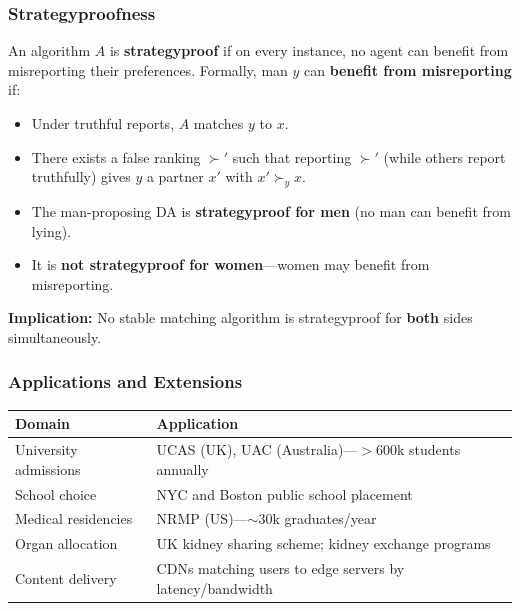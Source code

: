 \separator

\subsubsection{Strategyproofness}

\begin{defbox}[Strategyproofness]
An algorithm $A$ is \textbf{strategyproof} if on every instance, no agent can benefit from misreporting their preferences. Formally, man $y$ can \textbf{benefit from misreporting} if:
\begin{itemize}
  \item Under truthful reports, $A$ matches $y$ to $x$.
  \item There exists a false ranking $\succ'$ such that reporting $\succ'$ (while others report truthfully) gives $y$ a partner $x'$ with $x' \succ_y x$.
\end{itemize}
\end{defbox}

\begin{thmbox}[Strategyproofness of DA]
\begin{itemize}
  \item The man-proposing DA is \textbf{strategyproof for men} (no man can benefit from lying).
  \item It is \textbf{not strategyproof for women}---women may benefit from misreporting.
\end{itemize}

\textbf{Implication:} No stable matching algorithm is strategyproof for \textbf{both} sides simultaneously.
\end{thmbox}

\bigseparator

\subsubsection{Applications and Extensions}

\begin{defbox}
\begin{center}
\renewcommand{\arraystretch}{1.3}
\begin{tabular}{@{} l p{8.5cm} @{}}
\toprule
\textbf{Domain} & \textbf{Application} \\
\midrule
University admissions & UCAS (UK), UAC (Australia)---$>$600k students annually \\
School choice & NYC and Boston public school placement \\
Medical residencies & NRMP (US)---$\sim$30k graduates/year \\
Organ allocation & UK kidney sharing scheme; kidney exchange programs \\
Content delivery & CDNs matching users to edge servers by latency/bandwidth \\
\bottomrule
\end{tabular}
\end{center}
\end{defbox}

